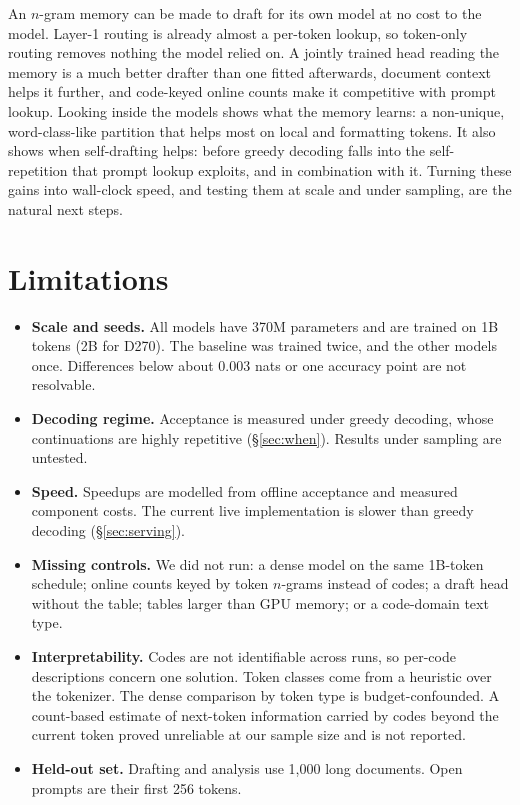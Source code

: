\documentclass[11pt]{article}
\newcommand{\Dense}{\textsc{D270}}
\begin{document}
An $n$-gram memory can be made to draft for its own model at no cost to the model. Layer-1 routing is already almost a
per-token lookup, so token-only routing removes nothing the model relied on. A jointly trained head reading the memory
is a much better drafter than one fitted afterwards, document context helps it further, and code-keyed online counts make
it competitive with prompt lookup. Looking inside the models shows what the memory learns: a non-unique, word-class-like
partition that helps most on local and formatting tokens. It also shows when self-drafting helps: before greedy
decoding falls into the self-repetition that prompt lookup exploits, and in combination with it. Turning these gains into
wall-clock speed, and testing them at scale and under sampling, are the natural next steps.

\section*{Limitations}

\begin{itemize}
\setlength\itemsep{1pt}
\item \textbf{Scale and seeds.} All models have 370M parameters and are trained on 1B tokens (2B for \Dense). The
baseline was trained twice, and the other models once. Differences below about 0.003 nats or one accuracy point are not
resolvable.
\item \textbf{Decoding regime.} Acceptance is measured under greedy decoding, whose continuations are highly repetitive
(\S\ref{sec:when}). Results under sampling are untested.
\item \textbf{Speed.} Speedups are modelled from offline acceptance and measured component costs. The current live
implementation is slower than greedy decoding (\S\ref{sec:serving}).
\item \textbf{Missing controls.} We did not run: a dense model on the same 1B-token schedule; online counts keyed by token
$n$-grams instead of codes; a draft head without the table; tables larger than GPU memory; or a code-domain text type.
\item \textbf{Interpretability.} Codes are not identifiable across runs, so per-code descriptions concern one solution.
Token classes come from a heuristic over the tokenizer. The dense comparison by token type is budget-confounded. A count-based
estimate of next-token information carried by codes beyond the current token proved unreliable at our sample size and is
not reported.
\item \textbf{Held-out set.} Drafting and analysis use 1{,}000 long documents. Open prompts are their first 256 tokens.
\end{itemize}
\end{document}
